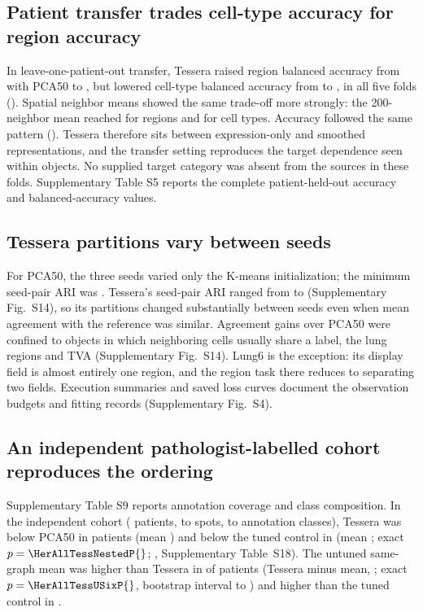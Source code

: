 \subsection{Patient transfer trades cell-type accuracy for region accuracy}
In leave-one-patient-out transfer, Tessera raised region balanced accuracy from \TransferRegionPca{} with PCA50 to \TransferRegionFull{}, but lowered cell-type balanced accuracy from \TransferCellPca{} to \TransferCellFull{}, in all five folds (). Spatial neighbor means showed the same trade-off more strongly: the 200-neighbor mean reached \TransferRegionMeanTwoHundred{} for regions and \TransferCellMeanTwoHundred{} for cell types. Accuracy followed the same pattern (). Tessera therefore sits between expression-only and smoothed representations, and the transfer setting reproduces the target dependence seen within objects. No supplied target category was absent from the sources in these folds. Supplementary Table S5 reports the complete patient-held-out accuracy and balanced-accuracy values.





\subsection{Tessera partitions vary between seeds}
For PCA50, the three seeds varied only the K-means initialization; the minimum seed-pair ARI was \StabilityPcaMin{}. Tessera's seed-pair ARI ranged from \StabilityTesseraMin{} to \StabilityTesseraMax{} (Supplementary Fig.~S14), so its partitions changed substantially between seeds even when mean agreement with the reference was similar. Agreement gains over PCA50 were confined to objects in which neighboring cells usually share a label, the lung regions and TVA (Supplementary Fig.~S14). Lung6 is the exception: its display field is almost entirely one region, and the region task there reduces to separating two fields. Execution summaries and saved loss curves document the observation budgets and fitting records (Supplementary Fig.~S4).

\subsection{An independent pathologist-labelled cohort reproduces the ordering}
Supplementary Table S9 reports annotation coverage and class composition. In the independent cohort (\HerPatients{} patients, \HerSpotsMin{} to \HerSpotsMax{} spots, \HerClassesMin{} to \HerClassesMax{} annotation classes), Tessera was below PCA50 in \HerAllTessPcaNeg{} patients (mean \HerAllTessPcaMean{}) and below the tuned control in \HerAllTessNestedNeg{} (mean \HerAllTessNestedMean{}; exact \(p=\HerAllTessNestedP{}\); , Supplementary Table~S18). The untuned same-graph mean was higher than Tessera in \HerAllTessUSixNeg{} of \HerPatients{} patients (Tessera minus mean, \HerAllTessUSixMean{}; exact \(p=\HerAllTessUSixP{}\), bootstrap interval \HerAllTessUSixLo{} to \HerAllTessUSixHi{}) and higher than the tuned control in \HerAllUSixNestedPos{}.

